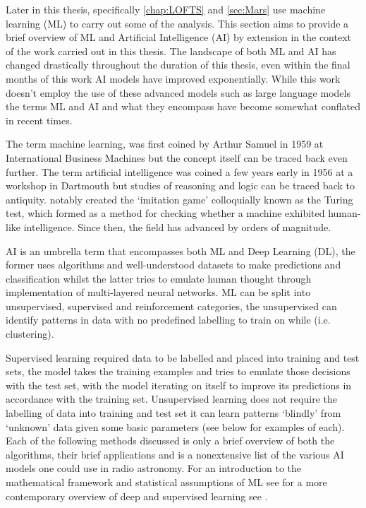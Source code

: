 Later in this thesis, specifically \cref{chap:LOFTS} and \cref{sec:Mars} use machine learning (ML) to carry out some of the analysis. This section aims to provide a brief overview of ML and Artificial Intelligence (AI) by extension in the context of the work carried out in this thesis. The landscape of both ML and AI has changed drastically throughout the duration of this thesis, even within the final months of this work AI models have improved exponentially. While this work doesn't employ the use of these advanced models such as large language models the terms ML and AI and what they encompass have become somewhat conflated in recent times. 

The term machine learning, was first coined by Arthur Samuel in 1959 at International Business Machines but the concept itself can be traced back even further. The term artificial intelligence was coined a few years early in 1956 at a workshop in Dartmouth but studies of reasoning and logic can be traced back to antiquity. \citet{turing_icomputing_1950} notably created the `imitation game' colloquially known as the Turing test, which formed as a method for checking whether a machine exhibited human-like intelligence. Since then, the field has advanced by orders of magnitude. 

AI is an umbrella term that encompasses both ML and Deep Learning (DL), the former uses algorithms and well-understood datasets to make predictions and classification whilst the latter tries to emulate human thought through implementation of multi-layered neural networks. ML can be split into unsupervised, supervised and reinforcement categories, the unsupervised can identify patterns in data with no predefined labelling to train on while (i.e. clustering). 

Supervised learning required data to be labelled and placed into training and test sets, the model takes the training examples and tries to emulate those decisions with the test set, with the model iterating on itself to improve its predictions in accordance with the training set. Unsupervised learning does not require the labelling of data into training and test set it can learn patterns `blindly' from `unknown' data given some basic parameters (see below for examples of each). Each of the following methods discussed is only a brief overview of both the algorithms, their brief applications and is a nonextensive list of the various AI models one could use in radio astronomy.  For an introduction to the mathematical framework and statistical assumptions of ML see \cite{Bishop_2016} for a more contemporary overview of deep and supervised learning see \cite{pml1Book}. 

